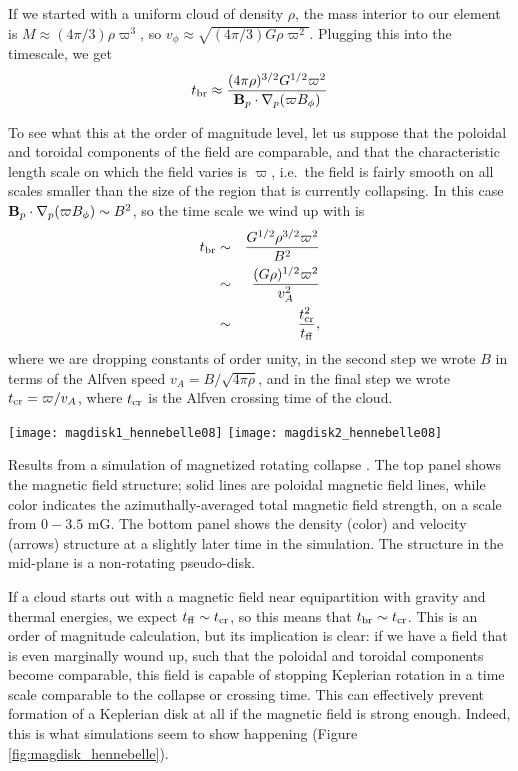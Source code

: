 If we started with a uniform cloud of density $\rho$, the mass interior to our element is $M\approx (4\pi/3) \rho \varpi^3$, so $v_\phi \approx \sqrt{(4\pi/3) G \rho \varpi^2}$. Plugging this into the timescale, we get
\begin{equation}
t_{\rm br} \approx \frac{(4\pi \rho)^{3/2} G^{1/2} \varpi^2}{\mathbf{B}_p \cdot\nabla_p (\varpi B_\phi)}
\end{equation}

To see what this at the order of magnitude level, let us suppose that the poloidal and toroidal components of the field are comparable, and that the characteristic length scale on which the field varies is $\varpi$, i.e.\ the field is fairly smooth on all scales smaller than the size of the region that is currently collapsing. In this case $\mathbf{B}_p \cdot \nabla_p (\varpi B_\phi) \sim B^2$, so the time scale we wind up with is
\begin{eqnarray}
t_{\rm br} & \sim & \frac{G^{1/2}\rho^{3/2} \varpi^2}{B^2} \\
& \sim & \frac{(G\rho)^{1/2} \varpi^2}{v_A^2} \\
& \sim & \frac{t_{\rm cr}^2}{t_{\rm ff}},
\end{eqnarray}
where we are dropping constants of order unity, in the second step we wrote $B$ in terms of the Alfven speed $v_A = B/\sqrt{4\pi \rho}$, and in the final step we wrote $t_{\rm cr} = \varpi/v_A$, where $t_{\rm cr}$ is the Alfven crossing time of the cloud.

\begin{marginfigure}
\texttt{[image: magdisk1\_hennebelle08]}
\texttt{[image: magdisk2\_hennebelle08]}
\caption[Simulations of magnetized rotating collapse]{
\label{fig:magdisk_hennebelle}
Results from a simulation of magnetized rotating collapse \citep{hennebelle08c}. The top panel shows the magnetic field structure; solid lines are poloidal magnetic field lines, while color indicates the azimuthally-averaged total magnetic field strength, on a scale from $0-3.5$ mG. The bottom panel shows the density (color) and velocity (arrows) structure at a slightly later time in the simulation. The structure in the mid-plane is a non-rotating pseudo-disk.
}
\end{marginfigure}

If a cloud starts out with a magnetic field near equipartition with gravity and thermal energies, we expect $t_{\rm ff} \sim t_{\rm cr}$, so this means that $t_{\rm br}\sim t_{\rm cr}$. This is an order of magnitude calculation, but its implication is clear: if we have a field that is even marginally wound up, such that the poloidal and toroidal components become comparable, this field is capable of stopping Keplerian rotation in a time scale comparable to the collapse or crossing time. This can effectively prevent formation of a Keplerian disk at all if the magnetic field is strong enough. Indeed, this is what simulations seem to show happening (Figure \ref{fig:magdisk_hennebelle}).

